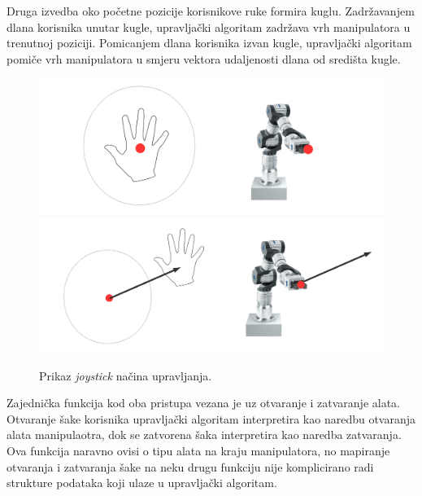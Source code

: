 \documentclass[times, utf8, diplomski, numeric]{fer}
\begin{document}
Druga izvedba oko početne pozicije korisnikove ruke formira kuglu.
Zadržavanjem dlana korisnika unutar kugle, upravljački algoritam zadržava vrh manipulatora u trenutnoj poziciji.
Pomicanjem dlana korisnika izvan kugle, upravljački algoritam pomiče vrh manipulatora u smjeru vektora udaljenosti dlana od središta kugle.
\begin{figure}
\centering
\includegraphics[scale=0.3]{koncept21}
\includegraphics[scale=0.3]{koncept22}
\caption{Prikaz \textit{joystick} načina upravljanja.}
\end{figure}
Zajednička funkcija kod oba pristupa vezana je uz otvaranje i zatvaranje alata. 
Otvaranje šake korisnika upravljački algoritam interpretira kao naredbu otvaranja alata manipulaotra, dok se zatvorena šaka interpretira kao naredba zatvaranja.
Ova funkcija naravno ovisi o tipu alata na kraju manipulatora, no mapiranje otvaranja i zatvaranja šake na neku drugu funkciju nije komplicirano radi strukture podataka koji ulaze u upravljački algoritam.
\end{document}
